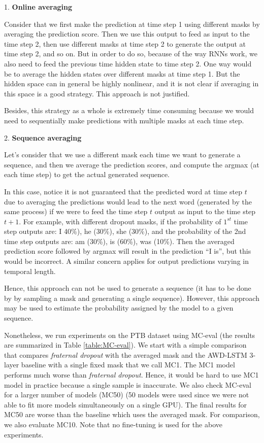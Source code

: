 \documentclass{article} %
\begin{document}
1. \textbf{Online averaging}

Consider that we first make the prediction at time step 1 using different masks by averaging the prediction score. Then we use this output to feed as input to the time step 2, then use different masks at time step 2 to generate the output at time step 2, and so on. But in order to do so, because of the way RNNs work, we also need to feed the previous time hidden state to time step 2. One way would be to average the hidden states over different masks at time step 1. But the hidden space can in general be highly nonlinear, and it is not clear if averaging in this space is a good strategy. This approach is not justified.

Besides, this strategy as a whole is extremely time consuming because we would need to sequentially make predictions with multiple masks at each time step.

2. \textbf{Sequence averaging}

Let's consider that we use a different mask each time we want to generate a sequence, and then we average the prediction scores, and compute the argmax (at each time step) to get the actual generated sequence.

In this case, notice it is not guaranteed that the predicted word at time step $t$ due to averaging the predictions would lead to the next word (generated by the same process) if we were to feed the time step $t$ output as input to the time step $t+1$. For example, with different dropout masks, if the probability of $1^{st}$ time step outputs are: I 40\%), he (30\%), she (30\%), and the probability of the 2nd time step outputs are: am (30\%), is (60\%), was (10\%). Then the averaged prediction score followed by argmax will result in the prediction ``I is'', but this would be incorrect. A similar concern applies for output predictions varying in temporal length.

Hence, this approach can not be used to generate a sequence (it has to be done by by sampling a mask and generating a single sequence). However, this approach may be used to estimate the probability assigned by the model to a given sequence.

Nonetheless, we run experiments on the PTB dataset using MC-eval (the results are summarized in Table \ref{table:MC-eval}). We start with a simple comparison that compares \emph{fraternal dropout} with the averaged mask and the AWD-LSTM 3-layer baseline with a single fixed mask that we call MC1. The MC1 model performs much worse than \emph{fraternal dropout}. Hence, it would be hard to use MC1 model in practice because a single sample is inaccurate. We also check MC-eval for a larger number of models (MC50) (50 models were used since we were not able to fit more models simultaneously on a single GPU). The final results for MC50 are worse than the baseline which uses the averaged mask. For comparison, we also evaluate MC10. Note that no fine-tuning is used for the above experiments.
\end{document}
